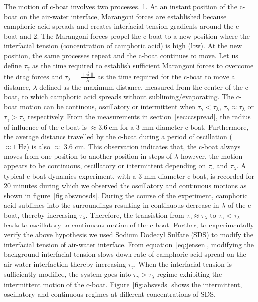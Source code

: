 \documentclass[aps, twocolumn, floatfix, superscriptaddress]{revtex4}
\begin{document}
The motion of c-boat involves two processes. 1. At an instant position of the c-boat on the air-water interface, Marangoni forces are established because camphoric acid spreads and creates interfacial tension gradients around the c-boat and 2. The Marangoni forces propel the c-boat to a new position where the interfacial tension (concentration of camphoric acid) is high (low). At the new position, the same processes repeat and the c-boat continues to move. Let us define $\tau_{\gamma}$ as the time required to establish sufficient Marangoni forces to overcome the drag forces and $\tau_{\lambda} = \frac{\|\vec{u}\|}{\lambda}$ as the time required for the c-boat to move a distance, $\lambda$ defined as the maximum distance, measured from the center of the c-boat, to which camphoric acid spreads without subliming/evaporating. The c-boat motion can be continous, oscillatory or intermittent when $\tau_{\gamma} < \tau_{\lambda}$, $\tau_{\gamma} \approx \tau_{\lambda}$ or $\tau_{\gamma} > \tau_{\lambda}$ respectively. From the measurements in section~\ref{sec:caspread}, the radius of influence of the c-boat is $\approx 3.6\ \mathrm{cm}$ for a 3 $\mathrm{mm}$ diameter c-boat. Furthermore, the average distance travelled by the c-boat during a period of oscillation ($\approx 1\ \mathrm{Hz}$) is also $\approx$ 3.6 $\mathrm{cm}$. This observation indicates that, the c-boat always moves from one position to another position in steps of $\lambda$ however, the motion appears to be continuous, oscillatory or intermittent depending on $\tau_{\gamma}$ and $\tau_{\lambda}$. A typical c-boat dynamics experiment, with a 3 $\mathrm{mm}$ diameter c-boat, is recorded for 20 minutes during which we observed the oscillatory and continuous motions as shown in figure~\ref{fig:absvnosds}. During the course of the experiment, camphoric acid sublimes into the surroundings resulting in continuous decrease in $\lambda$ of the c-boat, thereby increasing $\tau_{\lambda}$. Therefore, the transistion from $\tau_{\gamma} \approx \tau_{\lambda}$ to $\tau_{\gamma} < \tau_{\lambda}$ leads to oscillatory to continuous motion of the c-boat. Further, to experimentally verify the above hypothesis we used Sodium Dodecyl Sulfate (SDS) to modify the interfacial tension of air-water interface. From equation~\ref{eq:jensen}, modifying the background interfacial tension slows down rate of camphoric acid spread on the air-water interfaction thereby increasing $\tau_{\gamma}$. When the interfacial tension is sufficiently modified, the system goes into $\tau_{\gamma} > \tau_{\lambda}$ regime exhibiting the intermittent motion of the c-boat. Figure~\ref{fig:absvsds} shows the intermittent, oscillatory and continuous regimes at different concentrations of SDS.
\end{document}
